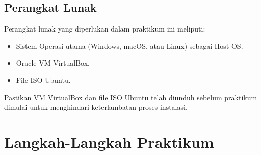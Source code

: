 \subsection{Perangkat Lunak}
Perangkat lunak yang diperlukan dalam praktikum ini meliputi:
\begin{itemize}
	\item Sistem Operasi utama (Windows, macOS, atau Linux) sebagai Host OS.
	\item Oracle VM VirtualBox.
	\item File ISO Ubuntu.
\end{itemize}
Pastikan VM VirtualBox dan file ISO Ubuntu telah diunduh sebelum praktikum dimulai untuk menghindari keterlambatan proses instalasi.

\newpage
\section{Langkah-Langkah Praktikum}

